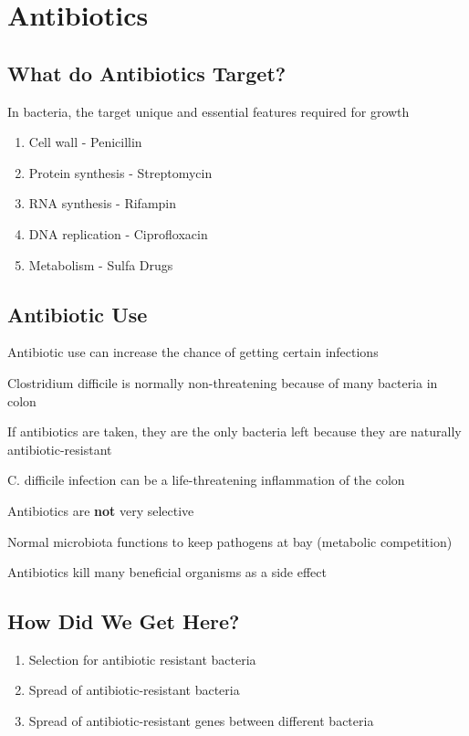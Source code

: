 \documentclass{notes}
\begin{document}
\section*{Antibiotics}
\subsection*{What do Antibiotics Target?}
In bacteria, the target unique and essential features required for growth

\begin{enumerate}
    \item Cell wall - Penicillin
    \item Protein synthesis - Streptomycin
    \item RNA synthesis - Rifampin
    \item DNA replication - Ciprofloxacin
    \item Metabolism - Sulfa Drugs
\end{enumerate}

\subsection*{Antibiotic Use}
Antibiotic use can increase the chance of getting certain infections

Clostridium difficile is normally non-threatening because of many bacteria in colon

If antibiotics are taken, they are the only bacteria left because they are naturally antibiotic-resistant

C. difficile infection can be a life-threatening inflammation of the colon

Antibiotics are \textbf{not} very selective

Normal microbiota functions to keep pathogens at bay (metabolic competition)

\tab \indicates Antibiotics kill many beneficial organisms as a side effect

\subsection*{How Did We Get Here?}
\begin{enumerate}
    \item Selection for antibiotic resistant bacteria
    \item Spread of antibiotic-resistant bacteria
    \item Spread of antibiotic-resistant genes between different bacteria
\end{enumerate}
\end{document}
